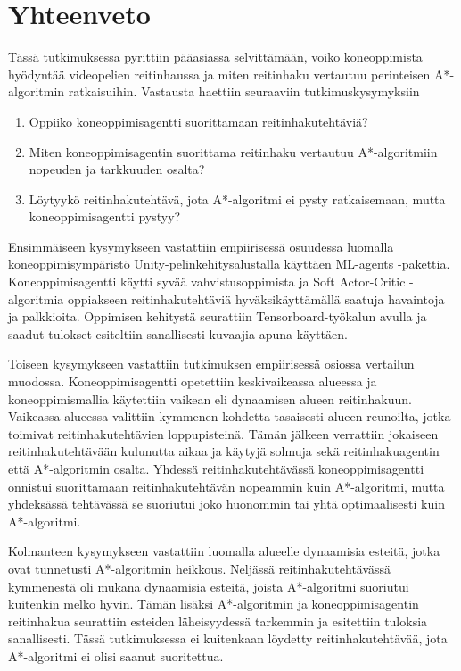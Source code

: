 \documentclass[utf8]{gradu3}
\begin{document}
\chapter{Yhteenveto}
\label{yhteenveto}

Tässä tutkimuksessa pyrittiin pääasiassa selvittämään, voiko koneoppimista hyödyntää videopelien reitinhaussa ja miten reitinhaku vertautuu perinteisen A*-algoritmin ratkaisuihin. Vastausta haettiin seuraaviin tutkimuskysymyksiin

\begin{enumerate}
\item Oppiiko koneoppimisagentti suorittamaan reitinhakutehtäviä?
\item Miten koneoppimisagentin suorittama reitinhaku vertautuu A*-algoritmiin nopeuden ja tarkkuuden osalta?
\item Löytyykö reitinhakutehtävä, jota A*-algoritmi ei pysty ratkaisemaan, mutta koneoppimisagentti pystyy?
\end{enumerate}

Ensimmäiseen kysymykseen vastattiin empiirisessä osuudessa luomalla koneoppimisympäristö Unity-pelinkehitysalustalla käyttäen ML-agents -pakettia. Koneoppimisagentti käytti syvää vahvistusoppimista ja Soft Actor-Critic -algoritmia oppiakseen reitinhakutehtäviä hyväksikäyttämällä saatuja havaintoja ja palkkioita. Oppimisen kehitystä seurattiin Tensorboard-työkalun avulla ja saadut tulokset esiteltiin sanallisesti kuvaajia apuna käyttäen.

Toiseen kysymykseen vastattiin tutkimuksen empiirisessä osiossa vertailun muodossa. Koneoppimisagentti opetettiin keskivaikeassa alueessa ja koneoppimismallia käytettiin vaikean eli dynaamisen alueen reitinhakuun. Vaikeassa alueessa valittiin kymmenen kohdetta tasaisesti alueen reunoilta, jotka toimivat reitinhakutehtävien loppupisteinä. Tämän jälkeen verrattiin jokaiseen reitinhakutehtävään kulunutta aikaa ja käytyjä solmuja sekä reitinhakuagentin että A*-algoritmin osalta. Yhdessä reitinhakutehtävässä koneoppimisagentti onnistui suorittamaan reitinhakutehtävän nopeammin kuin A*-algoritmi, mutta yhdeksässä tehtävässä se suoriutui joko huonommin tai yhtä optimaalisesti kuin A*-algoritmi.

Kolmanteen kysymykseen vastattiin luomalla alueelle dynaamisia esteitä, jotka ovat tunnetusti A*-algoritmin heikkous. Neljässä reitinhakutehtävässä kymmenestä oli mukana dynaamisia esteitä, joista A*-algoritmi suoriutui kuitenkin melko hyvin. Tämän lisäksi A*-algoritmin ja koneoppimisagentin reitinhakua seurattiin esteiden läheisyydessä tarkemmin ja esitettiin tuloksia sanallisesti. Tässä tutkimuksessa ei kuitenkaan löydetty reitinhakutehtävää, jota A*-algoritmi ei olisi saanut suoritettua.
\end{document}
